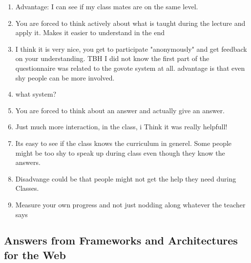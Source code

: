 \begin{enumerate}
    \item Advantage: I can see if my class mates are on the same level.

    \item You are forced to think actively about what is taught during the lecture and apply it. Makes it easier to understand in the end

    \item I think it is very nice, you get to participate "anonymously" and get feedback on your understanding. TBH I did not know the first part of the questionnaire was related to the govote system at all.
advantage is that even shy people can be more involved.

    \item what system? 

    \item You are forced to think about an answer and actually give an answer.

    \item Just much more interaction, in the class, i Think it was really helpfull!

    \item Its easy to see if the class knows the curriculum in generel. Some people might be too shy to speak up during class even though they know the answers.

    \item Disadvange could be that people might not get the help they need during Classes.

    \item Measure your own progress and not just nodding along whatever the teacher says
\end{enumerate}


\subsection{Answers from Frameworks and Architectures for the Web}\label{app:qualitative-frameworks}


